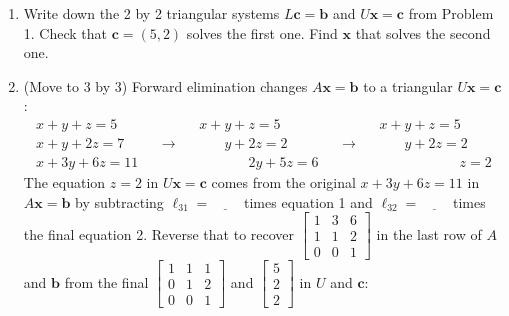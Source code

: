 \documentclass[14pt, a4paper]{article}
\begin{document}
\begin{enumerate}
    \item Write down the 2 by 2 triangular systems $L\boldsymbol{c} = \boldsymbol{b}$ and $U\boldsymbol{x} = \boldsymbol{c}$ from Problem 1. Check that $\boldsymbol{c} = (5,2)$ solves the first one. Find $\boldsymbol{x}$ that solves the second one.

    \item (Move to 3 by 3) Forward elimination changes $A\boldsymbol{x} = \boldsymbol{b}$ to a triangular $U\boldsymbol{x} = \boldsymbol{c}$:
          \[
              \begin{array}{l}
                  x + y + z = 5  \\
                  x + y + 2z = 7 \\
                  x + 3y + 6z = 11
              \end{array}
              \quad\longrightarrow\quad
              \begin{array}{l}
                  x + y + z = 5             \\
                  \phantom{x+{}} y + 2z = 2 \\
                  \phantom{x+y+{}} 2y + 5z = 6
              \end{array}
              \quad\longrightarrow\quad
              \begin{array}{l}
                  x + y + z = 5             \\
                  \phantom{x+{}} y + 2z = 2 \\
                  \phantom{x+y+{}} \phantom{2y+{}} z = 2
              \end{array}
          \]
          The equation $z = 2$ in $U\boldsymbol{x} = \boldsymbol{c}$ comes from the original $x + 3y + 6z = 11$ in $A\boldsymbol{x} = \boldsymbol{b}$ by subtracting $\ell_{31} = \underline{\hspace{2em}}$ times equation 1 and $\ell_{32} = \underline{\hspace{2em}}$ times the final equation 2. Reverse that to recover $\begin{bmatrix}1 & 3 & 6 \\ 1 & 1 & 2 \\ 0 & 0 & 1\end{bmatrix}$ in the last row of $A$ and $\boldsymbol{b}$ from the final $\begin{bmatrix}1 & 1 & 1 \\ 0 & 1 & 2 \\ 0 & 0 & 1\end{bmatrix}$ and $\begin{bmatrix}5 \\ 2 \\ 2\end{bmatrix}$ in $U$ and $\boldsymbol{c}$: \\

\end{enumerate}
\end{document}
